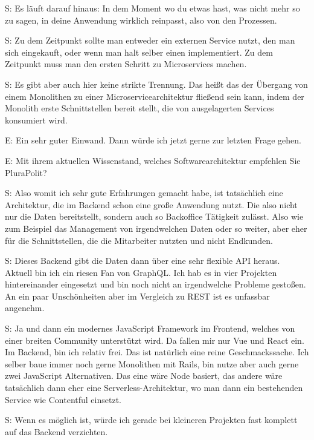  \label{appendix:s-28}
S: Es läuft darauf hinaus: In dem Moment wo du etwas hast, was nicht mehr so zu sagen, in deine Anwendung wirklich reinpasst, also von den Prozessen.

 \label{appendix:s-29}
S: Zu dem Zeitpunkt sollte man entweder ein externen Service nutzt, den man sich eingekauft, oder wenn man halt selber einen implementiert. Zu dem Zeitpunkt muss man den ersten Schritt zu Microservices machen. 

 \label{appendix:s-30}
S: Es gibt aber auch hier keine strikte Trennung. Das heißt das der Übergang von einem Monolithen zu einer Microservicearchitektur fließend sein kann, indem der Monolith erste Schnittstellen bereit stellt, die von ausgelagerten Services konsumiert wird.


E: Ein sehr guter Einwand. Dann würde ich jetzt gerne zur letzten Frage gehen.

E: Mit ihrem aktuellen Wissenstand, welches Softwarearchitektur empfehlen Sie PluraPolit?

 \label{appendix:s-31}
S:  Also womit ich sehr gute Erfahrungen gemacht habe, ist tatsächlich eine Architektur, die im Backend schon eine große Anwendung nutzt. Die also nicht nur die Daten bereitstellt, sondern auch so Backoffice Tätigkeit zulässt. Also wie zum Beispiel das Management von irgendwelchen Daten oder so weiter, aber eher für die Schnittstellen, die die Mitarbeiter nutzten und nicht Endkunden.

 \label{appendix:s-32}
S: Dieses Backend gibt die Daten dann über eine sehr flexible API heraus. Aktuell bin ich ein riesen Fan von GraphQL. Ich hab es in vier Projekten hintereinander eingesetzt und bin noch nicht an irgendwelche Probleme gestoßen. An ein paar Unschönheiten aber im Vergleich zu REST ist es unfassbar angenehm. 

 \label{appendix:s-33}
S: Ja und dann ein modernes JavaScript Framework im Frontend, welches von einer breiten Community unterstützt wird. Da fallen mir nur Vue und React ein. Im Backend, bin ich relativ frei. Das ist natürlich eine reine Geschmackssache. Ich selber baue immer noch gerne Monolithen mit Rails, bin nutze aber auch gerne zwei JavaScript Alternativen. Das eine wäre Node basiert, das andere wäre tatsächlich dann eher eine Serverless-Architektur, wo man dann ein bestehenden Service wie Contentful einsetzt. 

 \label{appendix:s-34}
S: Wenn es möglich ist, würde ich gerade bei kleineren Projekten fast komplett auf das Backend verzichten.

